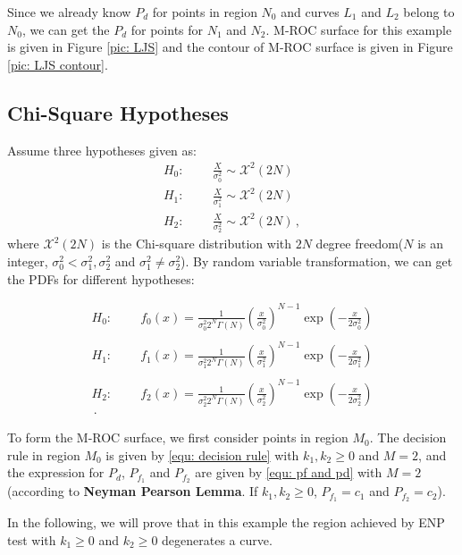 \documentclass[12pt,journal,a4paper,twoside,onecolumn,draft]{IEEEtran}
\begin{document}
\begin{spacing}{2.5}
Since we already know $P_d$ for points in region $N_0$ and curves $L_1$ and $L_2$ belong to $N_0$, we can get the $P_d$ for points for $N_1$ and $N_2$. M-ROC surface for this example is given in Figure  \ref{pic: LJS} and the contour of M-ROC surface is given in Figure \ref{pic: LJS contour}.

\subsection{Chi-Square Hypotheses}
Assume three hypotheses  given as:
\begin{equation}
  \label{equ: Chisquare Hypothesis}
  \begin{split}
    H_0:\;\;\;\;\;\;\;\;\frac{X}{\sigma_0^2} \sim \mathcal{X}^2(2N)\\
    H_1:\;\;\;\;\;\;\;\;\frac{X}{\sigma_1^2} \sim \mathcal{X}^2(2N)\\
    H_2:\;\;\;\;\;\;\;\;\frac{X}{\sigma_2^2} \sim \mathcal{X}^2(2N)\,,
  \end{split}
\end{equation}
where $\mathcal{X}^2(2N)$ is the Chi-square distribution with  $2N$ degree freedom($N$ is an integer, $\sigma_0^2 < \sigma_1^2, \sigma_2^2$ and $\sigma_1^2 \neq \sigma_2^2$). By random variable transformation\cite{mark2011probability}, we can get the PDFs for different hypotheses:

\def \CHISQU[#1]{\frac{1}{#1 2^N\Gamma(N)}\left(\frac{x}{#1}\right)^{N-1}\exp\left(-\frac{x}{2#1}\right)\\}
\begin{equation}
  \label{equ: Chisquare Distribution}
  \begin{split}
    H_0:\;\;\;\;\;\;\;\;f_0(x) = \CHISQU[\sigma_0^2]\\
    H_1:\;\;\;\;\;\;\;\;f_1(x) = \CHISQU[\sigma_1^2]\\
    H_2:\;\;\;\;\;\;\;\;f_2(x) = \CHISQU[\sigma_2^2]\,.
  \end{split}
\end{equation}

To form the M-ROC surface, we first consider points in region $M_0$.  The decision rule in region $M_0$ is given by \eqref{equ: decision rule}
with $k_1, k_2 \geq 0$ and $M = 2$, and the expression for $P_d$, $P_{f_1}$ and $P_{f_2}$ are given by \eqref{equ: pf and pd} with $M = 2$ (according to \textbf{Neyman Pearson Lemma}. If $k_1, k_2 \geq 0$, $P_{f_1} = c_1$ and $P_{f_2} = c_2$).

In the following, we will prove that in this example the region achieved by ENP test with $k_1 \geq 0$ and $k_2 \geq 0$ degenerates a curve.


\end{spacing}
\end{document}
